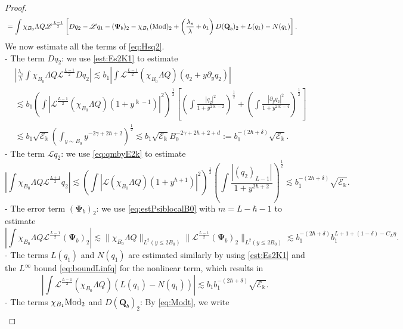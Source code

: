 \documentclass[11pt]{aims}
\theoremstyle{definition}
\numberwithin{equation}{section}
\begin{document}
\begin{proof}
\begin{align}
&= \int \chi_{B_0}\Lambda Q {\mathscr{L}}^{\frac{L -1}2}\left[  D q_2 - {\mathscr{L}} q_1 - (\mathbf{\Psi}_{b})_2 - \chi_{B_1}(\textup{Mod})_2 + \left(\frac{\lambda_s}{\lambda}  +b_1\right)D(\textbf{Q}_b)_2 + L(q_1) - N(q_1) \right].\nonumber
\end{align}
We now estimate all the terms of \eqref{eq:Hsq2}.\\
- The term $Dq_2$: we use \eqref{est:Es2K1} to estimate 
\begin{align*}
&\left|\frac{\lambda_s}{\lambda} \int \chi_{B_0}\Lambda Q {\mathscr{L}}^{\frac{L -1}2}Dq_2 \right| \lesssim b_1 \left|\int {\mathscr{L}}^{\frac{L - 1}2} (\chi_{B_0} \Lambda Q) (q_2 + y{\partial_y} q_2)\right| \\
& \lesssim b_1\left(\int \left| {\mathscr{L}}^{\frac{L - 1}2} (\chi_{B_0} \Lambda Q)( 1 + y^{\Bbbk - 1})  \right|^2\right)^\frac{1}{2} \left[ \left(\int \frac{|q_2|^2}{1 + y^{2\Bbbk - 2}} \right)^\frac 12 +  \left(\int \frac{|{\partial_y} q_2|^2}{1 + y^{2\Bbbk - 4}} \right)^\frac 12\right] \\
& \lesssim b_1 \sqrt{{\mathscr{E}}_\Bbbk}\left(\int_{y \sim B_0} y^{-2\gamma + 2\hbar + 2}\right)^\frac 12 \lesssim b_1\sqrt{{\mathscr{E}}_\Bbbk}B_0^{ -2\gamma + 2\hbar  + 2 + d}:= b_1^{-(2\hbar + \delta)} \sqrt{{\mathscr{E}}_\Bbbk}.
\end{align*}
- The term ${\mathscr{L}} q_2$: we use \eqref{eq:qmbyE2k} to estimate
$$\left|\int \chi_{B_0}\Lambda Q {\mathscr{L}}^{\frac{L + 1}{2}} q_2\right| \lesssim \left(\int |{\mathscr{L}} (\chi_{B_0}\Lambda Q) (1 + y^{\hbar   +1})|^2 \right)^\frac{1}{2} \left(\int \frac{|(q_2)_{L-1}|}{1 + y^{2\hbar  + 2}} \right)^\frac{1}{2} \lesssim b_1^{-(2\hbar + \delta)} \sqrt{{\mathscr{E}}_\Bbbk}.$$
- The error term $(\mathbf{\Psi}_b)_2$: we use \eqref{eq:estPsiblocalB0} with $m = L - \hbar - 1$ to estimate 
$$\left|\int \chi_{B_0}\Lambda Q {\mathscr{L}}^{\frac{L - 1}2} (\mathbf{\Psi}_{b})_2 \right| \lesssim \|\chi_{B_0} \Lambda Q \|_{L^2(y \leq 2B_0)} \|{\mathscr{L}}^{\frac{L - 1}2} (\mathbf{\Psi}_{b})_2\|_{L^2(y \leq 2B_0)} \lesssim b_1^{-(2\hbar + \delta)}b_1^{L + 1+ (1 - \delta) - C_L\eta}.$$ 
- The terms $L(q_1)$ and $N(q_1)$ are estimated similarly by using \eqref{est:Es2K1} and the $L^\infty$ bound \eqref{eq:boundLinfq} for the nonlinear term, which results in 
$$\left|\int {\mathscr{L}}^{\frac{L - 1}2}(\chi_{B_0}\Lambda Q) (L(q_1) - N(q_1))\right| \lesssim  b_1b_1^{-(2\hbar + \delta)}\sqrt{{\mathscr{E}}_\Bbbk}.$$
- The terms $\chi_{B_1}\textup{Mod}_2$ and $D(\mathbf{Q}_b)_2$: By \eqref{eq:Modt}, we write 
\begin{align*}

\end{align*}
\end{proof}
\end{document}
